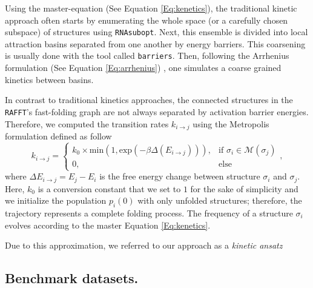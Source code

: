 Using the master-equation (See Equation \ref{Eq:kenetics}), the traditional kinetic approach often starts by enumerating the whole space (or a carefully chosen subspace) of structures using \texttt{RNAsubopt}. Next, this ensemble is divided into local attraction basins separated from one another by energy barriers. This coarsening is usually done with the tool called \texttt{barriers}. Then, following the Arrhenius formulation (See Equation \ref{Eq:arrhenius}) , one simulates a coarse grained kinetics between basins.  

In contrast to traditional kinetics approaches, the connected structures in the \texttt{RAFFT}'s fast-folding graph are not always separated by activation barrier energies. Therefore, we computed the transition rates $k_{i\rightarrow j}$ using the Metropolis \cite{klemm2008funnels} formulation defined as follow
\begin{equation}
\label{Eq:metropolis}
k_{i\rightarrow j} = \begin{cases}
k_0 \times \text{min}(1, \text{exp}(-\beta \Delta (E_{i \rightarrow j}))),& \text{if } \sigma_i \in \mathcal{M}(\sigma_j) \\
0,& \text{else }
\end{cases},
\end{equation}
where \(\Delta E_{i\rightarrow j} = E_j - E_i\) is the free energy change between structure \(\sigma_i\) and \(\sigma_j\). Here, \(k_0\) is a conversion constant that we set to $1$ for the sake of simplicity and we initialize the population \(p_i(0)\) with only unfolded structures; therefore, the trajectory represents a complete folding process. The frequency of a structure \(\sigma_i\) evolves according to the master Equation \ref{Eq:kenetics}.

Due to this approximation, we referred to our approach as a \textit{kinetic ansatz}
\subsection{Benchmark datasets. }


